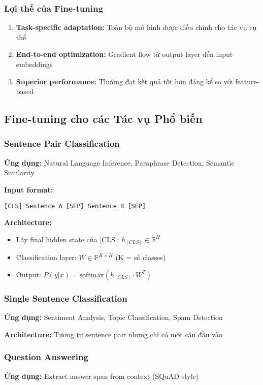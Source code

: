 \subsubsection{Lợi thế của Fine-tuning}
\begin{enumerate}
    \item \textbf{Task-specific adaptation:} Toàn bộ mô hình được điều chỉnh cho tác vụ cụ thể
    \item \textbf{End-to-end optimization:} Gradient flow từ output layer đến input embeddings
    \item \textbf{Superior performance:} Thường đạt kết quả tốt hơn đáng kể so với feature-based
\end{enumerate}

\subsection{Fine-tuning cho các Tác vụ Phổ biến}
\label{ssec:vi_du_tinh_chinh}

\subsubsection{Sentence Pair Classification}
\textbf{Ứng dụng:} Natural Language Inference, Paraphrase Detection, Semantic Similarity

\textbf{Input format:}
\begin{verbatim}
[CLS] Sentence A [SEP] Sentence B [SEP]
\end{verbatim}

\textbf{Architecture:}
\begin{itemize}
    \item Lấy final hidden state của [CLS]: $h_{[CLS]} \in \mathbb{R}^H$
    \item Classification layer: $W \in \mathbb{R}^{K \times H}$ (K = số classes)
    \item Output: $P(y|x) = \text{softmax}(h_{[CLS]} \cdot W^T)$
\end{itemize}

\subsubsection{Single Sentence Classification}  
\textbf{Ứng dụng:} Sentiment Analysis, Topic Classification, Spam Detection

\textbf{Architecture:} Tương tự sentence pair nhưng chỉ có một câu đầu vào

\subsubsection{Question Answering}
\textbf{Ứng dụng:} Extract answer span from context (SQuAD style)

